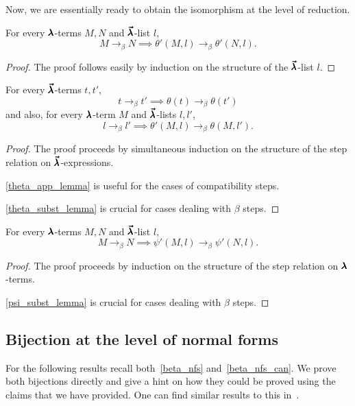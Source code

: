 Now, we are essentially ready to obtain the isomorphism at the level of reduction.

\begin{lemma}
  \label{theta_step_lemma}
  For every $\pmb{\lambda}$-terms $M, N$ and $\pmb{\vec \lambda}$-list $l$,
  \[ M \to_{\beta} N \implies \theta'(M, l) \to_{\beta} \theta'(N, l). \]
\end{lemma}
\begin{proof}
  The proof follows easily by induction on the structure of the $\pmb{\vec \lambda}$-list $l$.
\end{proof}

\begin{theorem}
  \label{theta_step_pres}
  For every $\pmb{\vec \lambda}$-terms $t, t'$,
  \[ t \to_{\beta} t' \implies \theta(t) \to_{\beta} \theta(t') \]
  and also, for every $\pmb{\lambda}$-term $M$ and $\pmb{\vec \lambda}$-lists $l, l'$,
  \[ l \to_{\beta} l' \implies \theta'(M, l) \to_{\beta} \theta(M, l'). \]
\end{theorem}
\begin{proof}
  The proof proceeds by simultaneous induction on the structure of the step relation on $\pmb{\vec \lambda}$-expressions.

  \cref{theta_app_lemma} is useful for the cases of compatibility steps.

  \cref{theta_subst_lemma} is crucial for cases dealing with $\beta$ steps.
\end{proof}


\begin{theorem}
  \label{psi_step_pres}
  For every $\pmb{\lambda}$-terms $M, N$ and $\pmb{\vec \lambda}$-list $l$,
  \[ M \to_{\beta} N \implies \psi'(M, l) \to_{\beta} \psi'(N, l). \]
\end{theorem}
\begin{proof}
  The proof proceeds by induction on the structure of the step relation on $\pmb{\lambda}$-terms.

  \cref{psi_subst_lemma} is crucial for cases dealing with $\beta$ steps.
\end{proof}


\subsection{Bijection at the level of normal forms}

For the following results recall both~\cref{beta_nfs} and~\cref{beta_nfs_can}.
We prove both bijections directly and give a hint on how they could be proved using the claims that we have provided.
One can find similar results to this in~\cite{LuisDychkoff}.

